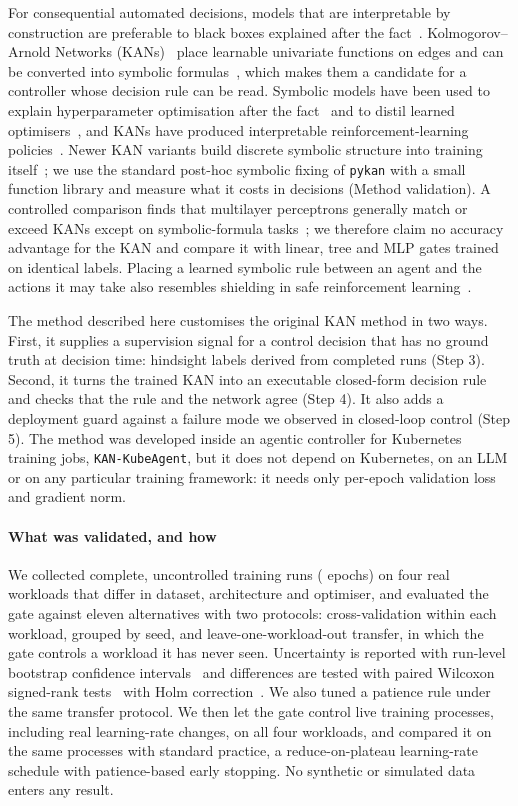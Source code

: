 For consequential automated decisions, models that are interpretable by construction are preferable to black boxes explained after the fact~\cite{rudin2019stop}. Kolmogorov--Arnold Networks (KANs)~\cite{liu2025kan} place learnable univariate functions on edges and can be converted into symbolic formulas~\cite{liu2024kan2}, which makes them a candidate for a controller whose decision rule can be read. Symbolic models have been used to explain hyperparameter optimisation after the fact~\cite{segel2023symbolic} and to distil learned optimisers~\cite{zheng2022symbolicl2o}, and KANs have produced interpretable reinforcement-learning policies~\cite{singh2025kanrl}. Newer KAN variants build discrete symbolic structure into training itself~\cite{faroughi2026symbolickan}; we use the standard post-hoc symbolic fixing of \texttt{pykan} with a small function library and measure what it costs in decisions (Method validation). A controlled comparison finds that multilayer perceptrons generally match or exceed KANs except on symbolic-formula tasks~\cite{yu2024kanormlp}; we therefore claim no accuracy advantage for the KAN and compare it with linear, tree and MLP gates trained on identical labels. Placing a learned symbolic rule between an agent and the actions it may take also resembles shielding in safe reinforcement learning~\cite{alshiekh2018shielding}.

The method described here customises the original KAN method in two ways. First, it supplies a supervision signal for a control decision that has no ground truth at decision time: hindsight labels derived from completed runs (Step 3). Second, it turns the trained KAN into an executable closed-form decision rule and checks that the rule and the network agree (Step 4). It also adds a deployment guard against a failure mode we observed in closed-loop control (Step 5). The method was developed inside an agentic controller for Kubernetes training jobs, \texttt{KAN-KubeAgent}, but it does not depend on Kubernetes, on an LLM or on any particular training framework: it needs only per-epoch validation loss and gradient norm.

\paragraph{What was validated, and how}
We collected \nRuns{} complete, uncontrolled training runs (\nEpochsRecorded{} epochs) on four real workloads that differ in dataset, architecture and optimiser, and evaluated the gate against eleven alternatives with two protocols: cross-validation within each workload, grouped by seed, and leave-one-workload-out transfer, in which the gate controls a workload it has never seen. Uncertainty is reported with run-level bootstrap confidence intervals~\cite{efron1993bootstrap} and differences are tested with paired Wilcoxon signed-rank tests~\cite{wilcoxon1945} with Holm correction~\cite{holm1979}. We also tuned a patience rule under the same transfer protocol. We then let the gate control live training processes, including real learning-rate changes, on all four workloads, and compared it on the same processes with standard practice, a reduce-on-plateau learning-rate schedule with patience-based early stopping. No synthetic or simulated data enters any result.
